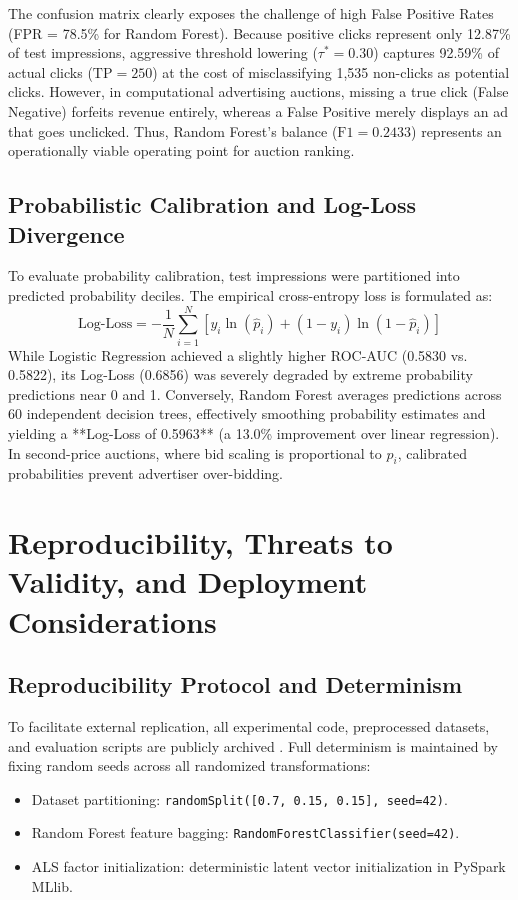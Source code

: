 \documentclass[10pt,a4paper,twoside]{article}
\begin{document}
The confusion matrix clearly exposes the challenge of high False Positive Rates (FPR = 78.5\% for Random Forest). Because positive clicks represent only 12.87\% of test impressions, aggressive threshold lowering ($\tau^* = 0.30$) captures 92.59\% of actual clicks ($\text{TP} = 250$) at the cost of misclassifying 1,535 non-clicks as potential clicks. However, in computational advertising auctions, missing a true click (False Negative) forfeits revenue entirely, whereas a False Positive merely displays an ad that goes unclicked. Thus, Random Forest's balance ($\text{F1} = 0.2433$) represents an operationally viable operating point for auction ranking.

\subsection{Probabilistic Calibration and Log-Loss Divergence}
To evaluate probability calibration, test impressions were partitioned into predicted probability deciles. The empirical cross-entropy loss is formulated as:
\begin{equation}
\text{Log-Loss} = -\frac{1}{N} \sum_{i=1}^N \left[ y_i \ln(\hat{p}_i) + (1 - y_i) \ln(1 - \hat{p}_i) \right]
\end{equation}
While Logistic Regression achieved a slightly higher ROC-AUC (0.5830 vs. 0.5822), its Log-Loss (0.6856) was severely degraded by extreme probability predictions near 0 and 1. Conversely, Random Forest averages predictions across 60 independent decision trees, effectively smoothing probability estimates and yielding a **Log-Loss of 0.5963** (a 13.0\% improvement over linear regression). In second-price auctions, where bid scaling is proportional to $\hat{p}_i$, calibrated probabilities prevent advertiser over-bidding.

\section{Reproducibility, Threats to Validity, and Deployment Considerations}

\subsection{Reproducibility Protocol and Determinism}
To facilitate external replication, all experimental code, preprocessed datasets, and evaluation scripts are publicly archived \cite{pandey2026}. Full determinism is maintained by fixing random seeds across all randomized transformations:
\begin{itemize}
    \item Dataset partitioning: \texttt{randomSplit([0.7, 0.15, 0.15], seed=42)}.
    \item Random Forest feature bagging: \texttt{RandomForestClassifier(seed=42)}.
    \item ALS factor initialization: deterministic latent vector initialization in PySpark MLlib.
\end{itemize}
\end{document}
